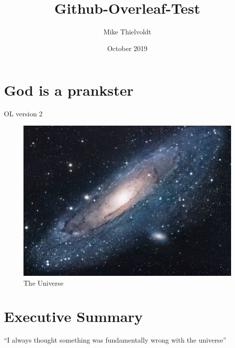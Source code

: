 \documentclass{article}
\title{Github-Overleaf-Test}
\author{Mike Thielvoldt}
\date{October 2019}
\begin{document}
\maketitle

\section{God is a prankster}
OL version 2

\begin{figure}[h!]
\centering
\includegraphics[scale=1.7]{universe}
\caption{The Universe}
\label{fig:universe}
\end{figure}


\section{Executive Summary}
``I always thought something was fundamentally wrong with the universe'' \citep{adams1995hitchhiker}



\end{document}
